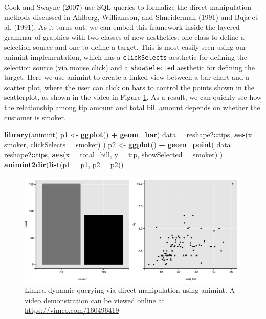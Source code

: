 \documentclass[12pt,]{article}
\newenvironment{Shaded}{\begin{snugshade}}{\end{snugshade}}
\newcommand{\KeywordTok}[1]{\textcolor[rgb]{0.13,0.29,0.53}{\textbf{#1}}}
\newcommand{\DataTypeTok}[1]{\textcolor[rgb]{0.13,0.29,0.53}{#1}}
\newcommand{\StringTok}[1]{\textcolor[rgb]{0.31,0.60,0.02}{#1}}
\newcommand{\OperatorTok}[1]{\textcolor[rgb]{0.81,0.36,0.00}{\textbf{#1}}}
\newcommand{\NormalTok}[1]{#1}
\theoremstyle{definition}
\theoremstyle{definition}
\theoremstyle{remark}
\begin{document}
Cook and Swayne (2007) use SQL queries to formalize the direct
manipulation methods discussed in Ahlberg, Williamson, and Shneiderman
(1991) and Buja et al. (1991). As it turns out, we can embed this
framework inside the layered grammar of graphics with two classes of new
aesthetics: one class to define a selection source and one to define a
target. This is most easily seen using our animint implementation, which
has a \texttt{clickSelects} aesthetic for defining the selection source
(via mouse click) and a \texttt{showSelected} aesthetic for defining the
target. Here we use animint to create a linked view between a bar chart
and a scatter plot, where the user can click on bars to control the
points shown in the scatterplot, as shown in the video in Figure
\ref{fig:tips}. As a result, we can quickly see how the relationship
among tip amount and total bill amount depends on whether the customer
is smoker.

\begin{Shaded}
\begin{Highlighting}[]
\KeywordTok{library}\NormalTok{(animint)}
\NormalTok{p1 <-}\StringTok{ }\KeywordTok{ggplot}\NormalTok{() }\OperatorTok{+}\StringTok{ }\KeywordTok{geom_bar}\NormalTok{(}
  \DataTypeTok{data =}\NormalTok{ reshape2}\OperatorTok{::}\NormalTok{tips, }
  \KeywordTok{aes}\NormalTok{(}\DataTypeTok{x =}\NormalTok{ smoker, }\DataTypeTok{clickSelects =}\NormalTok{ smoker)}
\NormalTok{)}
\NormalTok{p2 <-}\StringTok{ }\KeywordTok{ggplot}\NormalTok{() }\OperatorTok{+}\StringTok{ }\KeywordTok{geom_point}\NormalTok{(}
  \DataTypeTok{data =}\NormalTok{ reshape2}\OperatorTok{::}\NormalTok{tips, }
  \KeywordTok{aes}\NormalTok{(}\DataTypeTok{x =}\NormalTok{ total_bill, }\DataTypeTok{y =}\NormalTok{ tip, }
      \DataTypeTok{showSelected =}\NormalTok{ smoker)}
\NormalTok{)}
\KeywordTok{animint2dir}\NormalTok{(}\KeywordTok{list}\NormalTok{(}\DataTypeTok{p1 =}\NormalTok{ p1, }\DataTypeTok{p2 =}\NormalTok{ p2))}
\end{Highlighting}
\end{Shaded}

\begin{figure}
\centering
\includegraphics{images/tips}
\caption{\label{fig:tips}Linked dynamic querying via direct manipulation
using animint. A video demonstration can be viewed online at
\url{https://vimeo.com/160496419}}
\end{figure}
\end{document}
